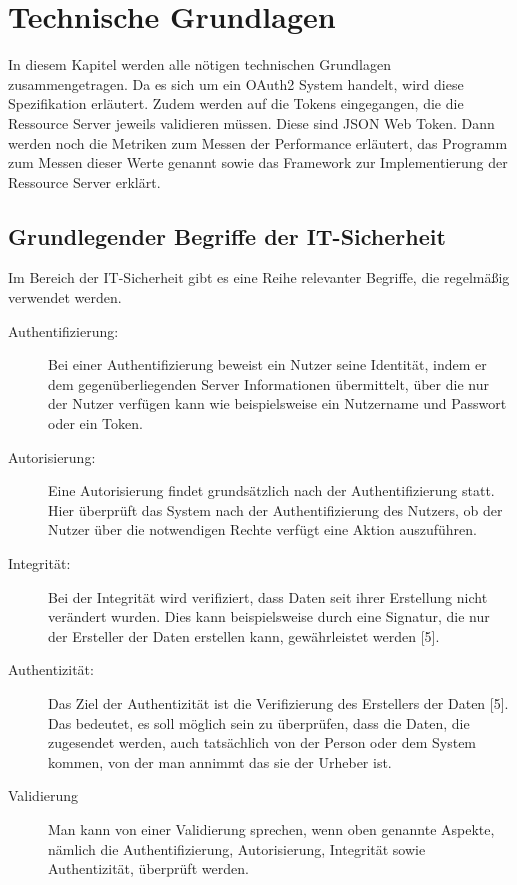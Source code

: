 \chapter{Technische Grundlagen}
\label{ch:background}
In diesem Kapitel werden alle nötigen technischen Grundlagen zusammengetragen. Da es sich um ein OAuth2 System handelt, wird diese Spezifikation erläutert. Zudem werden auf die Tokens eingegangen, die die Ressource Server jeweils validieren müssen. Diese sind \ac{JSON} Web Token. Dann werden noch die Metriken zum Messen der Performance erläutert, das Programm zum Messen dieser Werte genannt sowie das Framework zur Implementierung der Ressource Server erklärt. 

%
%
\section{Grundlegender Begriffe der IT-Sicherheit}
\label{sec:background:first_section}
Im Bereich der IT-Sicherheit gibt es eine Reihe relevanter Begriffe, die regelmäßig verwendet werden.

\begin{description}
  \item[Authentifizierung:] Bei einer Authentifizierung beweist ein Nutzer seine Identität, indem er dem gegenüberliegenden Server Informationen übermittelt, über die nur der Nutzer verfügen kann wie beispielsweise ein Nutzername und Passwort oder ein Token.
  \item[Autorisierung:] Eine Autorisierung findet grundsätzlich nach der Authentifizierung statt. Hier überprüft das System nach der Authentifizierung des Nutzers, ob der Nutzer über die notwendigen Rechte verfügt eine Aktion auszuführen. 
  \item[Integrität:] Bei der Integrität wird verifiziert, dass Daten seit ihrer Erstellung nicht verändert wurden. Dies kann beispielsweise durch eine Signatur, die nur der Ersteller der Daten erstellen kann, gewährleistet werden [5].
  \item[Authentizität:] Das Ziel der Authentizität ist die Verifizierung des Erstellers der Daten [5]. Das bedeutet, es soll möglich sein zu überprüfen, dass die Daten, die zugesendet werden, auch tatsächlich von der Person oder dem System kommen, von der man annimmt das sie der Urheber ist.
  \item[Validierung] Man kann von einer Validierung sprechen, wenn oben genannte Aspekte, nämlich die Authentifizierung, Autorisierung, Integrität sowie Authentizität, überprüft werden.
\end{description}

